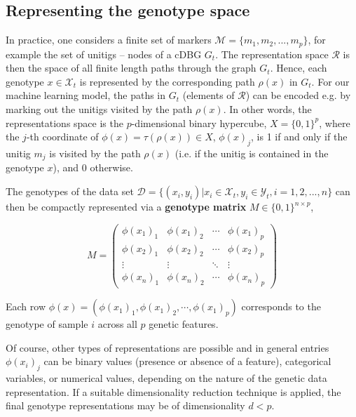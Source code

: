 \documentclass[12pt]{article}
\begin{document}
\subsection{Representing the genotype space} \label{sec:g_matrix}


In practice, one considers a finite set of markers $\mathcal{M} = \{m_1, m_2, ..., m_p\}$, for example the set of unitigs -- nodes of a cDBG $G_t$. The representation space $\mathcal{R}$ is then the space of all finite length paths through the graph $G_t$. Hence, each genotype $x \in \mathcal{X}_t$ is represented by the corresponding path $\rho(x)$ in $G_t$. For our machine learning model, the paths in $G_t$ (elements of $\mathcal{R}$) can be encoded e.g. by marking out the unitigs visited by the path $\rho(x)$. In other words, the representations space is the $p$-dimensional binary hypercube, $X = \{0,1\}^p$, where the $j$-th coordinate of $\phi(x) = \tau(\rho(x)) \in X$, $\phi(x)_j$, is 1 if and only if the unitig $m_j$ is visited by the path $\rho(x)$ (i.e. if the unitig is contained in the genotype $x$), and 0 otherwise.

The genotypes of the data set {$\mathcal{D} = \{ (x_i, y_i)| x_i \in \mathcal{X}_t, y_i \in \mathcal{Y}_t, i=1,2,...,n\}$} can then be compactly represented via a \textbf{genotype matrix} $M \in \{ 0,1 \}^{n \times p}$,

\begin{equation*}
    M = 
\begin{pmatrix}
    \phi(x_1)_1 & \phi(x_1)_2 & \cdots & \phi(x_1)_p \\
    \phi(x_2)_1 & \phi(x_2)_2 & \cdots & \phi(x_2)_p \\
    \vdots & \vdots & \ddots & \vdots \\
    \phi(x_n)_1 & \phi(x_n)_2 & \cdots & \phi(x_n)_p 
\end{pmatrix}
\end{equation*}

Each row $\phi(x) = (\phi(x_1)_1, \phi(x_1)_2, \cdots,  \phi(x_1)_p)$ corresponds to the genotype of sample $i$ across all $p$ genetic features.

Of course, other types of representations are possible and in general
entries $\phi(x_i)_j$ can be binary values (presence or absence of a feature), categorical variables, or numerical values, depending on the nature of the genetic data representation. If a suitable dimensionality reduction technique is applied, the final genotype representations may be of dimensionality $d<p$.
\end{document}
